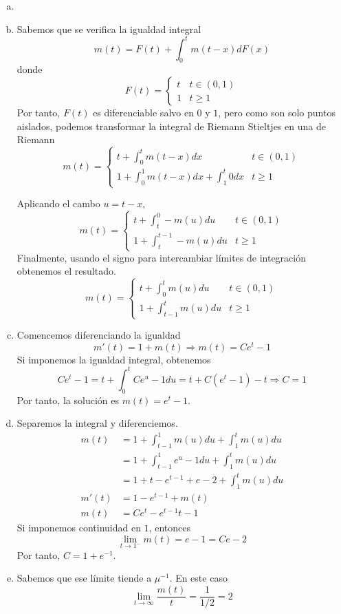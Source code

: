 \documentclass[twoside]{article}
\begin{document}
\begin{solucion}
\begin{enumerate}[a)]
\item[]
\item Sabemos que se verifica la igualdad integral
$$
m(t) = F(t)+\int_0^t m(t-x)dF(x)
$$
donde 
$$
F(t)= \begin{cases}
t & t\in(0,1)\\
1 & t \geq 1
\end{cases}
$$
Por tanto, $F(t)$ es diferenciable salvo en $0$ y $1$, pero como son solo puntos aislados, podemos transformar la integral de Riemann Stieltjes en una de Riemann
$$
m(t) = \begin{cases}
t + \int_0^t m(t-x)dx  & t\in(0,1)\\
 1 + \int_0^1 m(t-x)dx + \int_1^t 0 dx & t\geq 1
\end{cases}
$$

Aplicando el cambo $u=t-x$, 
$$
m(t) = \begin{cases}
 t + \int_t^0 -m(u)du   & t\in(0,1)\\
 1 + \int_t^{t-1} -m(u)du & t\geq 1
\end{cases}
$$
Finalmente, usando el signo para intercambiar límites de integración obtenemos el resultado.
$$
m(t) = \begin{cases}
t+\int_0^t m(u)du & t\in(0,1)\\
1+\int_{t-1}^tm(u)du & t\geq 1
\end{cases}
$$
\item Comencemos diferenciando la igualdad
$$
m'(t) = 1 + m(t) \Rightarrow m(t)=Ce^t-1
$$
Si imponemos la igualdad integral, obtenemos
$$
Ce^t -1 = t + \int_0^t Ce^u-1du = t + C(e^t-1)-t \Rightarrow C=1
$$
Por tanto, la solución es $m(t)=e^t-1$.
\item Separemos la integral y diferenciemos.
\begin{align*}
m(t) &= 1+ \int_{t-1}^1 m(u)du + \int_1^t m(u)du \\
&= 1 + \int_{t-1}^1 e^u -1 du + \int_1^tm(u)du\\
&= 1+t-e^{t-1}+e-2 + \int_1^t m(u)du\\
m'(t)& = 1-e^{t-1} + m(t)\\
m(t)&= Ce^t -e^{t-1}t -1  
\end{align*}
Si imponemos continuidad en $1$, entonces 
$$
\lim_{t\to1^-} m(t) = e-1 = Ce-2
$$
Por tanto, $C= 1 + e^{-1}$.
\item Sabemos que ese límite tiende a $\mu^{-1}$. En este caso
$$
\lim_{t\to \infty} \frac{m(t)}{t} = \frac{1}{1/2} = 2
$$
\end{enumerate}
\end{solucion}
\end{document}
